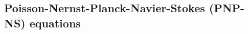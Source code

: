 \documentclass[journal=ancac3, manuscript=article, etalmode=truncate,maxauthors=0]{achemso}
\begin{document}




\subsection{Poisson-Nernst-Planck-Navier-Stokes (PNP-NS) equations}

%
%
\end{document}
